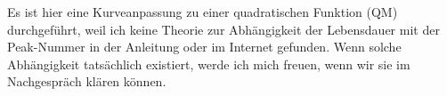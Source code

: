 			Es ist hier eine Kurveanpassung zu einer quadratischen Funktion (QM) durchgeführt, weil ich keine Theorie zur Abhängigkeit der Lebensdauer mit der Peak-Nummer in der Anleitung oder im Internet gefunden. Wenn solche Abhängigkeit tatsächlich existiert, werde ich mich freuen, wenn wir sie im Nachgespräch klären können.











